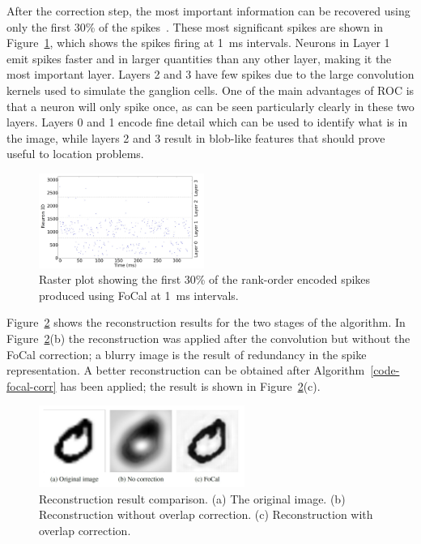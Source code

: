 After the correction step, the most important information can be recovered using only the first 30\% of the spikes~\cite{sen2009evaluating}. These most significant spikes are shown in Figure~\ref{fig-raster-plot-30pc}, which shows the spikes firing at 1~ms intervals. Neurons in Layer 1 emit spikes faster and in larger quantities than any other layer, making it the most important layer. Layers 2 and 3 have few spikes due to the large convolution kernels used to simulate the ganglion cells. One of the main advantages of ROC is that a neuron will only spike once, as can be seen particularly clearly in these two layers. Layers 0 and 1 encode fine detail which can be used to identify what is in the image, while layers 2 and 3 result in blob-like features that should prove useful to location problems.

\begin{figure}[hbt]
	\centering
	\includegraphics[width=0.48\textwidth]{pics_bench/fig3}
	\caption{Raster plot showing the first 30\% of the rank-order encoded spikes produced using FoCal at 1~ms intervals.}
	\label{fig-raster-plot-30pc}
\end{figure}

Figure~\ref{fig-reconstruction-results} shows the reconstruction results for the two stages of the algorithm. In Figure~\ref{fig-reconstruction-results}(b) the reconstruction was applied after the convolution but without the FoCal correction; a blurry image is the result of redundancy in the spike representation. A better reconstruction can be obtained after Algorithm~\ref{code-focal-corr} has been applied; the result is shown in Figure~\ref{fig-reconstruction-results}(c).


\begin{figure}[hbt]
	\centering
	\includegraphics[width=0.6\textwidth]{pics_bench/fig4}
	\caption{Reconstruction result comparison. (a) The original image. (b) Reconstruction without overlap correction. (c) Reconstruction with overlap correction.}
	\label{fig-reconstruction-results}
\end{figure}

